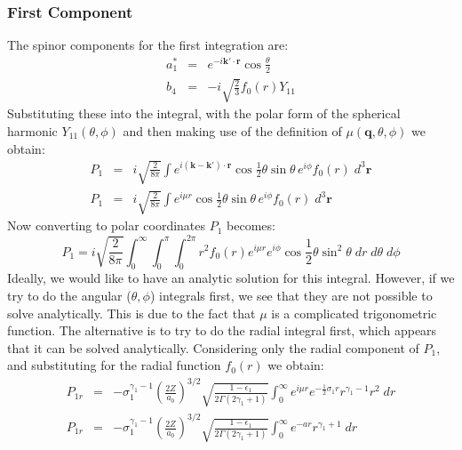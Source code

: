 \documentclass[a4paper,titlepage]{report}
\newcommand{\mb}[1]{\mathbf{#1}}
\begin{document}
	\subsubsection{First Component}
	The spinor components for the first integration are:
	\begin{eqnarray*}
		a_1^* & = & e^{-i \mb{k'} \cdot \mb{r} } \cos \frac{\theta}{2} \\
		b_4   & = & -i \sqrt{\frac{2}{3}} f_0(r) Y_{11}
	\end{eqnarray*}
	Substituting these into the integral, with the polar form of the spherical
	harmonic $Y_{11}(\theta,\phi)$ and then making use of the definition of
	$\mu(\mb{q},\theta,\phi)$ we obtain:
	\begin{eqnarray*}
	P_1 & = & i \sqrt{\frac{2}{8 \pi}} \int e^{i (\mb{k} - \mb{k'}) \cdot \mb{r} }
				\cos\frac{1}{2}\theta \sin\theta \, e^{i\phi} f_0(r)
			  \; d^3 \mb{r} \\
	P_1 & = & i \sqrt{\frac{2}{8 \pi}} \int e^{i \mu r}
				\cos\frac{1}{2}\theta \sin\theta \, e^{i\phi} f_0(r)
			    \; d^3 \mb{r} 
	\end{eqnarray*}
	Now converting to polar coordinates $P_1$ becomes:
	\begin{equation*}
	P_1  =  i \sqrt{\frac{2}{8\pi}}
				\int_0^\infty
				\int_0^{\pi}
				\int_0^{2\pi}
					r^2 f_0(r) e^{i \mu r} e^{i\phi} 
					\cos\frac{1}{2}\theta \sin^2 \theta 
				\; dr 
				\; d\theta 
				\; d\phi 
	\end{equation*}
	Ideally, we would like to have an analytic solution for this integral.
	However, if we try to do the angular ($\theta,\phi$) integrals first, we see
	that they are not possible to solve analytically. This is due to the
	fact that $\mu$ is a complicated trigonometric function. The alternative is
	to try to do the radial integral first, which appears that it can be solved
	analytically.
	Considering only the radial component of $P_1$, and substituting for the
	radial function $f_0(r)$ we obtain:
	\begin{eqnarray*}
	P_{1r} & = & - \sigma_1^{\gamma_1 - 1} \left( \frac{2Z}{a_0} \right)^{3/2}
			 \sqrt{ \frac{1-\epsilon_1}{2 \Gamma(2\gamma_1 + 1) } }
			 \int_0^\infty
		 	 e^{i\mu r} e^{-\frac{1}{2} \sigma_1 r} r^{\gamma_1 - 1} r^2 
			 \; dr \\
	P_{1r} & = & -\sigma_1^{\gamma_1 -1 } \left(\frac{2Z}{a_0} \right)^{3/2}
			\sqrt{\frac{1-\epsilon_1}{2\Gamma(2\gamma_1 + 1)}}
			\int_0^\infty 
				e^{-ar} r^{\gamma_1 + 1}
			\; dr
	\end{eqnarray*}
\end{document}

